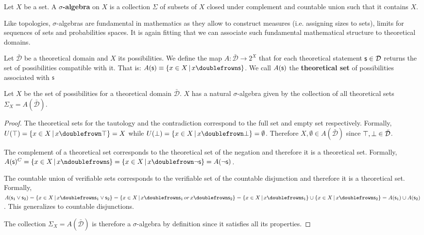\documentclass[11pt,letterpaper,fleqn]{memoir} %
\begin{document}
\begin{mathSection}
	\begin{defn}
		Let $X$ be a set. A \textbf{$\sigma$-algebra} on $X$ is a collection $\Sigma$ of subsets of $X$ closed under complement and countable union such that it contains $X$.
	\end{defn}
\end{mathSection}

Like topologies, $\sigma$-algebras are fundamental in mathematics as they allow to construct measures (i.e. assigning sizes to sets), limits for sequences of sets and probabilities spaces. It is again fitting that we can associate such fundamental mathematical structure to theoretical domains.

\begin{mathSection}
	
	\begin{defn}
		Let $\bar{\mathcal{D}}$ be a theoretical domain and $X$ its possibilities. We define the map $A : \bar{\mathcal{D}} \rightarrow 2^X$ that for each theoretical statement $\mathsf{s} \in \mathcal{D}$ returns the set of possibilities compatible with it. That is: $A(\stmt)\equiv\{ x \in X \, | \, x \comp \stmt\}$. We call $A(\mathsf{s})$ the \textbf{theoretical set} of possibilities associated with $\mathsf{s}$
	\end{defn}
	
	\begin{prop}
		Let $X$ be the set of possibilities for a theoretical domain $\bar{\mathcal{D}}$. $X$ has a natural $\sigma$-algebra given by the collection of all theoretical sets $\Sigma_X=A(\bar{\mathcal{D}})$.
	\end{prop}
	
	\begin{proof}
	The theoretical sets for the tautology and the contradiction correspond to the full set and empty set respectively. Formally, $U(\tautology) = \{ x \in X \, | \, x \comp \tautology\} = X$ while $U(\contradiction) = \{ x \in X \, | \, x \comp \contradiction\} = \emptyset$. Therefore $X, \emptyset \in A(\bar{\mathcal{D}})$ since $\top, \bot \in \bar{\mathcal{D}}$.

	The complement of a theoretical set corresponds to the theoretical set of the negation and therefore it is a theoretical set. Formally, $A(\stmt)^C = \{ x \in X \, | \, x \ncomp \stmt\} =  \{ x \in X \, | \, x \comp \NOT\stmt\} = A(\NOT\stmt)$.

	The countable union of verifiable sets corresponds to the verifiable set of the countable disjunction and therefore it is a theoretical set. Formally, $A(\stmt_1\OR\stmt_2) = \{ x \in X \, | \, x \comp \stmt_1\OR\stmt_2\} =  \{ x \in X \, | \, x \comp \stmt_1 \, or \, x \comp \stmt_2\} = \{ x \in X \, | \, x \comp \stmt_1\} \cup \{ x \in X \, | \, x \comp \stmt_2\} = A(\stmt_1) \cup A(\stmt_2)$. This generalizes to countable disjunctions.

	The collection $\Sigma_X=A(\bar{\mathcal{D}})$ is therefore a $\sigma$-algebra by definition since it satisfies all its properties.
	\end{proof}
\end{mathSection}
\end{document}
